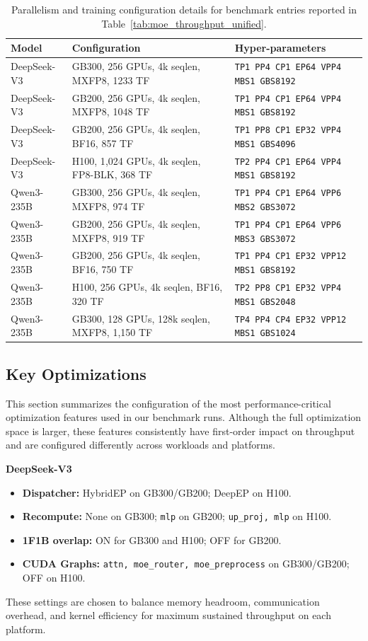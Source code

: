 \begin{table}[t]
\centering
\small
\caption{Parallelism and training configuration details for benchmark entries reported in Table~\ref{tab:moe_throughput_unified}.}
\label{tab:appendix_showcase_configs}
\begin{tabular}{lll}
\toprule
Model & Configuration & Hyper-parameters \\
\midrule
DeepSeek-V3 & GB300, 256 GPUs, 4k seqlen, MXFP8, 1233 TF      & \texttt{TP1 PP4 CP1 EP64 VPP4 MBS1 GBS8192} \\
DeepSeek-V3 & GB200, 256 GPUs, 4k seqlen, MXFP8, 1048 TF      & \texttt{TP1 PP4 CP1 EP64 VPP4 MBS1 GBS8192} \\
DeepSeek-V3 & GB200, 256 GPUs, 4k seqlen, BF16, 857 TF        & \texttt{TP1 PP8 CP1 EP32 VPP4 MBS1 GBS4096} \\
DeepSeek-V3 & H100, 1{,}024 GPUs, 4k seqlen, FP8-BLK, 368 TF  & \texttt{TP2 PP4 CP1 EP64 VPP4 MBS1 GBS8192} \\
\midrule
Qwen3-235B & GB300, 256 GPUs, 4k seqlen, MXFP8, 974 TF        & \texttt{TP1 PP4 CP1 EP64 VPP\phantom{0}6 MBS2 GBS3072} \\
Qwen3-235B & GB200, 256 GPUs, 4k seqlen, MXFP8, 919 TF        & \texttt{TP1 PP4 CP1 EP64 VPP\phantom{0}6 MBS3 GBS3072} \\
Qwen3-235B & GB200, 256 GPUs, 4k seqlen, BF16, 750 TF         & \texttt{TP1 PP4 CP1 EP32 VPP12 MBS1 GBS8192} \\
Qwen3-235B & H100, 256 GPUs, 4k seqlen, BF16, 320 TF          & \texttt{TP2 PP8 CP1 EP32 VPP\phantom{0}4 MBS1 GBS2048} \\
\midrule
Qwen3-235B & GB300, 128 GPUs, 128k seqlen, MXFP8, 1{,}150 TF    & \texttt{TP4 PP4 CP4 EP32 VPP12 MBS1 GBS1024} \\
\bottomrule
\end{tabular}
\end{table}

\subsection{Key Optimizations} 
This section summarizes the configuration of the most performance-critical optimization features used in our benchmark runs. Although the full optimization space is larger, these features consistently have first-order impact on throughput and are configured differently across workloads and platforms.

\textbf{DeepSeek-V3}
\begin{itemize}[noitemsep,topsep=0pt]
    \item \textbf{Dispatcher:} HybridEP on GB300/GB200; DeepEP on H100.
    \item \textbf{Recompute:} None on GB300; \texttt{mlp} on GB200; \texttt{up\_proj, mlp} on H100.
    \item \textbf{1F1B overlap:} ON for GB300 and H100; OFF for GB200.
    \item \textbf{CUDA Graphs:} \texttt{attn, moe\_router, moe\_preprocess} on GB300/GB200; OFF on H100.
\end{itemize}
These settings are chosen to balance memory headroom, communication overhead, and kernel efficiency for maximum sustained throughput on each platform.


